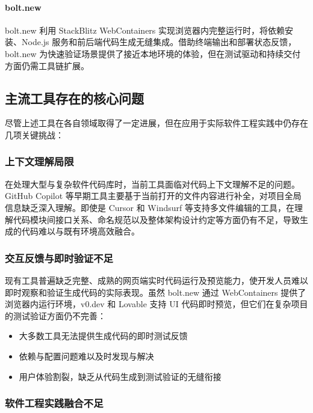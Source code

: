 \paragraph{bolt.new}  
bolt.new 利用 StackBlitz WebContainers 实现浏览器内完整运行时，将依赖安装、Node.js 服务和前后端代码生成无缝集成。借助终端输出和部署状态反馈，bolt.new 为快速验证场景提供了接近本地环境的体验，但在测试驱动和持续交付方面仍需工具链扩展\cite{arunachalam2024boltnew,boltnewgithub2024}。

\subsection{主流工具存在的核心问题}

尽管上述工具在各自领域取得了一定进展，但在应用于实际软件工程实践中仍存在几项关键挑战：

\subsubsection{上下文理解局限}

在处理大型与复杂软件代码库时，当前工具面临对代码上下文理解不足的问题。GitHub Copilot 等早期工具主要基于当前打开的文件内容进行补全，对项目全局信息缺乏深入理解\cite{DivaCopilot}。即使是 Cursor 和 Windsurf 等支持多文件编辑的工具，在理解代码模块间接口关系、命名规范以及整体架构设计约定等方面仍有不足，导致生成的代码难以与既有环境高效融合。

\subsubsection{交互反馈与即时验证不足}

现有工具普遍缺乏完整、成熟的网页端实时代码运行及预览能力，使开发人员难以即时观察和验证生成代码的实际表现。虽然 bolt.new 通过 WebContainers 提供了浏览器内运行环境，v0.dev 和 Lovable 支持 UI 代码即时预览，但它们在复杂项目的测试验证方面仍不完善：

\begin{itemize}
    \item 大多数工具无法提供生成代码的即时测试反馈
    \item 依赖与配置问题难以及时发现与解决
    \item 用户体验割裂，缺乏从代码生成到测试验证的无缝衔接
\end{itemize}

\subsubsection{软件工程实践融合不足}


